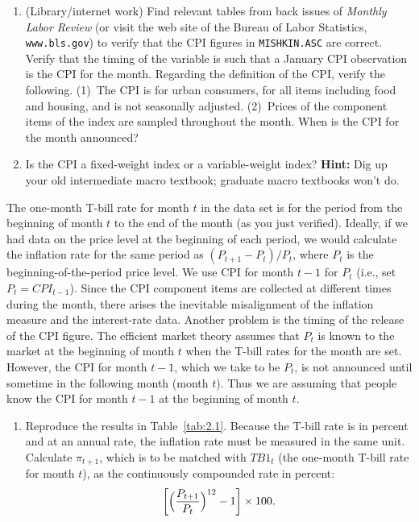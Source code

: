\begin{problemset}
\begin{enumerate}[label=(\alph*)]
\item (Library/internet work)\quad
Find relevant tables from back issues of \emph{Monthly
Labor Review} (or visit the web site of the Bureau of Labor Statistics,
\texttt{www.bls.gov}) to verify that the CPI figures in \texttt{MISHKIN.ASC} are correct.
Verify that the timing of the variable is such that a January CPI observation
is the CPI for the month. Regarding the definition of the CPI, verify the
following. (1)~The CPI is for urban consumers, for all items including food
and housing, and is not seasonally adjusted. (2)~Prices of the component
items of the index are sampled throughout the month. When is the CPI for
the month announced?

\item Is the CPI a fixed-weight index or a variable-weight index? \textbf{Hint:} Dig up
your old intermediate macro textbook; graduate macro textbooks won't do.
\end{enumerate}

The one-month T-bill rate for month $t$ in the data set is for the period from
the beginning of month $t$ to the end of the month (as you just verified). Ideally,
if we had data on the price level at the beginning of each period, we would
calculate the inflation rate for the same period as $(P_{t+1} - P_t)/P_t$, where $P_t$
is the beginning-of-the-period price level. We use CPI for month $t - 1$ for
$P_t$ (i.e., set $P_t = CPI_{t-1}$). Since the CPI component items are collected at
different times during the month, there arises the inevitable misalignment of
the inflation measure and the interest-rate data. Another problem is the timing
of the release of the CPI figure. The efficient market theory assumes that $P_t$ is
known to the market at the beginning of month $t$ when the T-bill rates for the
month are set. However, the CPI for month $t - 1$, which we take to be $P_t$, is
not announced until sometime in the following month (month $t$). Thus we are
assuming that people know the CPI for month $t - 1$ at the beginning of month $t$.

\begin{enumerate}[label=(\alph*),start=4]
\item Reproduce the results in Table~\ref{tab:2.1}. Because the T-bill rate is in percent and
at an annual rate, the inflation rate must be measured in the same unit. Calculate $\pi_{t+1}$, which is to be matched with $\mathit{TB1}_t$ (the one-month T-bill rate
for month $t$), as the continuously compounded rate in percent:
\[
\left[\Bigl(\frac{P_{t+1}}{P_t}\Bigr)^{12} - 1\right] \times 100.
\]


\end{enumerate}
\end{problemset}
